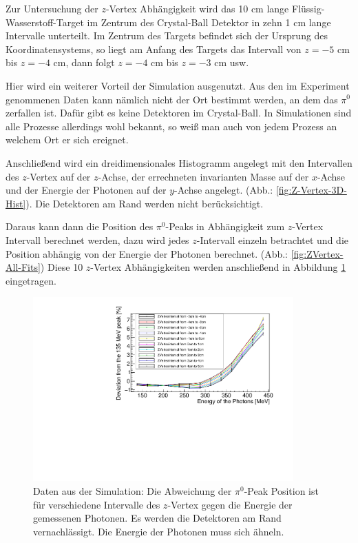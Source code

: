 \documentclass[a4paper,11pt,oneside,final,german,openbib,pdftex]{scrbook}
\begin{document}
{Zur Untersuchung der $z$-Vertex Abhängigkeit wird das 10 cm lange Fl\"ussig-Wasserstoff-Target im Zentrum des Crystal-Ball Detektor in zehn 1 cm lange Intervalle unterteilt. 
Im Zentrum des Targets befindet sich der Ursprung des Koordinatensystems, so liegt am Anfang des Targets das Intervall von $z=-5$ cm bis $z=-4$ cm, dann folgt $z=-4$ cm bis $z=-3$ cm usw. 

Hier wird ein weiterer Vorteil der Simulation ausgenutzt. Aus den im Experiment genommenen Daten kann n\"amlich nicht der Ort bestimmt werden, an dem das $\pi^0$ zerfallen ist. Daf\"ur gibt es keine Detektoren im Crystal-Ball. In Simulationen sind alle Prozesse allerdings wohl bekannt, so wei{\ss} man auch von jedem Prozess an welchem Ort er sich ereignet. 

Anschließend wird ein dreidimensionales Histogramm angelegt mit den Intervallen des $z$-Vertex auf der $z$-Achse, der errechneten invarianten Masse auf der $x$-Achse und der Energie der Photonen auf der $y$-Achse angelegt. (Abb.: \ref{fig:Z-Vertex-3D-Hist}). Die Detektoren am Rand werden nicht ber\"ucksichtigt.

Daraus kann dann die Position des $\pi^0$-Peaks in Abhängigkeit zum $z$-Vertex Intervall berechnet werden, dazu wird jedes $z$-Intervall einzeln betrachtet und die Position abhängig von der Energie der Photonen berechnet. (Abb.: \ref{fig:ZVertex-All-Fits})
Diese 10 $z$-Vertex Abhängigkeiten werden anschließend in Abbildung \ref{fig:Z-Vertex-Multi-Graph} eingetragen.

\begin{figure}[h!]
	\begin{center}
		\includegraphics[width=100mm]{20172804MCZVertexDeviation}
		\caption[Simulation: Abweichung f\"ur verschiedene $z$-Vertices]{Daten aus der Simulation: Die Abweichung der $\pi^0$-Peak Position ist für verschiedene Intervalle des $z$-Vertex gegen die Energie der gemessenen Photonen. Es werden die Detektoren am Rand vernachl\"assigt. Die Energie der Photonen muss sich \"ahneln.}
		\label{fig:Z-Vertex-Multi-Graph}
	\end{center}
\end{figure}

}
\end{document}
